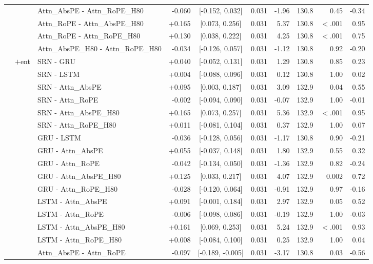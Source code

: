 \begin{longtable}{@{}lllrcrrrrr@{}}
 &  & Attn\_AbsPE - Attn\_RoPE\_H80 & -0.060 & [-0.152, 0.032] & 0.031 & -1.96 & 130.8 & 0.45 & -0.34 \\
 &  & Attn\_RoPE - Attn\_AbsPE\_H80 & +0.165 & [0.073, 0.256] & 0.031 & 5.37 & 130.8 & $<$.001 & 0.95 \\
 &  & Attn\_RoPE - Attn\_RoPE\_H80 & +0.130 & [0.038, 0.222] & 0.031 & 4.25 & 130.8 & $<$.001 & 0.75 \\
 &  & Attn\_AbsPE\_H80 - Attn\_RoPE\_H80 & -0.034 & [-0.126, 0.057] & 0.031 & -1.12 & 130.8 & 0.92 & -0.20 \\
\addlinespace[2pt]
 & $+$ent & SRN - GRU & +0.040 & [-0.052, 0.131] & 0.031 & 1.29 & 130.8 & 0.85 & 0.23 \\
 &  & SRN - LSTM & +0.004 & [-0.088, 0.096] & 0.031 & 0.12 & 130.8 & 1.00 & 0.02 \\
 &  & SRN - Attn\_AbsPE & +0.095 & [0.003, 0.187] & 0.031 & 3.09 & 132.9 & 0.04 & 0.55 \\
 &  & SRN - Attn\_RoPE & -0.002 & [-0.094, 0.090] & 0.031 & -0.07 & 132.9 & 1.00 & -0.01 \\
 &  & SRN - Attn\_AbsPE\_H80 & +0.165 & [0.073, 0.257] & 0.031 & 5.36 & 132.9 & $<$.001 & 0.95 \\
 &  & SRN - Attn\_RoPE\_H80 & +0.011 & [-0.081, 0.104] & 0.031 & 0.37 & 132.9 & 1.00 & 0.07 \\
 &  & GRU - LSTM & -0.036 & [-0.128, 0.056] & 0.031 & -1.17 & 130.8 & 0.90 & -0.21 \\
 &  & GRU - Attn\_AbsPE & +0.055 & [-0.037, 0.148] & 0.031 & 1.80 & 132.9 & 0.55 & 0.32 \\
 &  & GRU - Attn\_RoPE & -0.042 & [-0.134, 0.050] & 0.031 & -1.36 & 132.9 & 0.82 & -0.24 \\
 &  & GRU - Attn\_AbsPE\_H80 & +0.125 & [0.033, 0.217] & 0.031 & 4.07 & 132.9 & 0.002 & 0.72 \\
 &  & GRU - Attn\_RoPE\_H80 & -0.028 & [-0.120, 0.064] & 0.031 & -0.91 & 132.9 & 0.97 & -0.16 \\
 &  & LSTM - Attn\_AbsPE & +0.091 & [-0.001, 0.184] & 0.031 & 2.97 & 132.9 & 0.05 & 0.52 \\
 &  & LSTM - Attn\_RoPE & -0.006 & [-0.098, 0.086] & 0.031 & -0.19 & 132.9 & 1.00 & -0.03 \\
 &  & LSTM - Attn\_AbsPE\_H80 & +0.161 & [0.069, 0.253] & 0.031 & 5.24 & 132.9 & $<$.001 & 0.93 \\
 &  & LSTM - Attn\_RoPE\_H80 & +0.008 & [-0.084, 0.100] & 0.031 & 0.25 & 132.9 & 1.00 & 0.04 \\
 &  & Attn\_AbsPE - Attn\_RoPE & -0.097 & [-0.189, -0.005] & 0.031 & -3.17 & 130.8 & 0.03 & -0.56 \\

\end{longtable}

